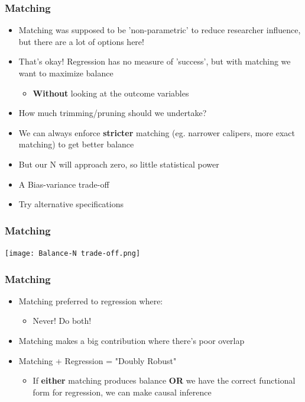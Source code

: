 \documentclass[xcolor=x11names,compress]{beamer}\usepackage[]{graphicx}\usepackage[]{color}
\renewcommand{\(}{\begin{columns}}
\renewcommand{\)}{\end{columns}}
\newcommand{\<}[1]{\begin{column}{#1}}
\renewcommand{\>}{\end{column}}
\begin{document}
\begin{frame}
\frametitle{Matching}
\begin{itemize}
\item Matching was supposed to be 'non-parametric' to reduce researcher influence, but there are a lot of options here!
\pause
\item That's okay! Regression has no measure of 'success', but with matching we want to maximize balance
\pause
\begin{itemize}
\item \textbf{Without} looking at the outcome variables
\end{itemize}
\pause
\item How much trimming/pruning should we undertake?
\pause
\item We can always enforce \textbf{stricter} matching (eg. narrower calipers, more exact matching) to get better balance
\pause
\item But our N will approach zero, so little statistical power
\pause
\item A Bias-variance trade-off
\pause
\item Try alternative specifications
\end{itemize}
\end{frame}

\begin{frame}
\frametitle{Matching}
\texttt{[image: Balance-N trade-off.png]}
\end{frame}

\begin{frame}
\frametitle{Matching}
\begin{itemize}
\item Matching preferred to regression where:
\pause
\begin{itemize}
\item Never! Do both!
\end{itemize}
\item Matching makes a big contribution where there's poor overlap
\pause
\item Matching + Regression = "Doubly Robust"
\pause
\begin{itemize}
\item If \textbf{either} matching produces balance \textbf{OR} we have the correct functional form for regression, we can make causal inference
\end{itemize}
\end{itemize}
\end{frame}
\end{document}
